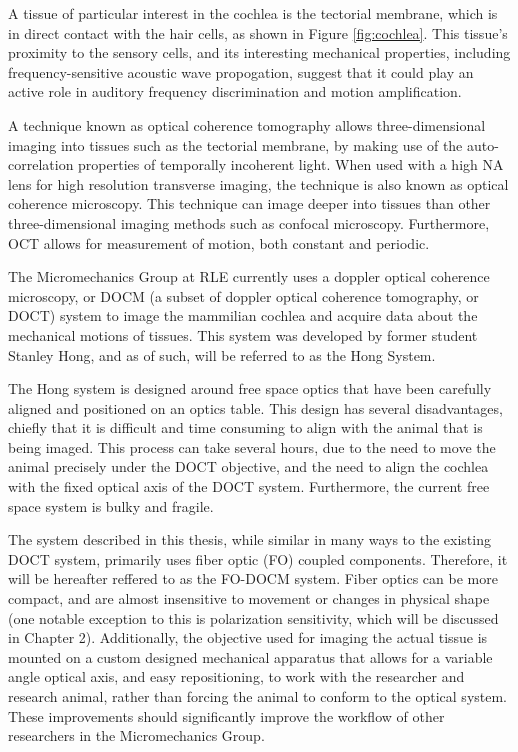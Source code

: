 A tissue of particular interest in the cochlea is the tectorial membrane, which is in direct contact with the hair cells, as shown in Figure \ref{fig:cochlea}. This tissue's proximity to the sensory cells, and its interesting mechanical properties, including frequency-sensitive acoustic wave propogation, suggest that it could play an active role in auditory frequency discrimination and motion amplification. \cite{Ghaffari2010}


A technique known as optical coherence tomography allows three-dimensional imaging into tissues such as the tectorial membrane, by making use of the auto-correlation properties of temporally incoherent light. When used with a high NA lens for high resolution transverse imaging, the technique is also known as optical coherence microscopy. This technique can image deeper into tissues than other three-dimensional imaging methods such as confocal microscopy. Furthermore, OCT allows for measurement of motion, both constant and periodic. \cite{DrexlerBook}

The Micromechanics Group at RLE currently uses a doppler optical coherence microscopy, or DOCM (a subset of doppler optical coherence tomography, or DOCT) system to image the mammilian cochlea and acquire data about the mechanical motions of tissues. This system was developed by former student Stanley Hong, and as of such, will be referred to as the Hong System. \cite{hong}

The Hong system is designed around free space optics that have been carefully aligned and positioned on an optics table. This design has several disadvantages, chiefly that it is difficult and time consuming to align with the animal that is being imaged. This process can take several hours, due to the need to move the animal precisely under the DOCT objective, and the need to align the cochlea with the fixed optical axis of the DOCT system. Furthermore, the current free space system is bulky and fragile.

The system described in this thesis, while similar in many ways to the existing DOCT system, primarily uses fiber optic (FO) coupled components. Therefore, it will be hereafter reffered to as the FO-DOCM system. Fiber optics can be more compact, and are almost insensitive to movement or changes in physical shape (one notable exception to this is polarization sensitivity, which will be discussed in Chapter 2). Additionally, the objective used for imaging the actual tissue is mounted on a custom designed mechanical apparatus that allows for a variable angle optical axis, and easy repositioning, to work with the researcher and research animal, rather than forcing the animal to conform to the optical system. These improvements should significantly improve the workflow of other researchers in the Micromechanics Group.

